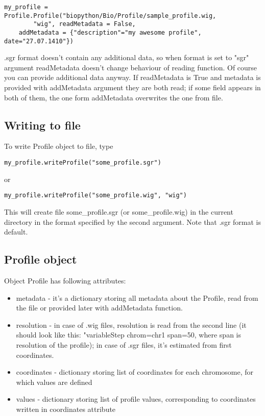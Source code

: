 \documentclass[a4paper,11pt,portrait]{article}
\begin{document}
\begin{verbatim}
my_profile = Profile.Profile("biopython/Bio/Profile/sample_profile.wig,
		"wig", readMetadata = False,
	addMetadata = {"description"="my awesome profile", date="27.07.1410"})
\end{verbatim}

.sgr format doesn't contain any additional data,
 so when format is set to "sgr" argument readMetadata doesn't change behaviour of reading function.
 Of course you can provide additional data anyway.
 If readMetadata is True and metadata is provided with addMetadata argument
 they are both read;
 if some field appears in both of them,
 the one form addMetadata overwrites the one from file.

\subsection{Writing to file}

To write Profile object to file, type

\begin{verbatim}
my_profile.writeProfile("some_profile.sgr")
\end{verbatim}

or

\begin{verbatim}
my_profile.writeProfile("some_profile.wig", "wig")
\end{verbatim}

This will create file some\_profile.sgr (or some\_profile.wig) in the current directory
 in the format specified by the second argument.
 Note that .sgr format is default.


\subsection{Profile object}

Object Profile has following attributes:

	\begin{itemize}

		\item metadata - it's a dictionary storing all metadata about the Profile,
			read from the file or provided later with addMetadata function.
		\item resolution - in case of .wig files,
			resolution is read from the second line
			(it should look like this: "variableStep chrom=chr1 span=50,
			where span is resolution of the profile);
			in case of .sgr files,
			it's estimated from first coordinates.
		\item coordinates - dictionary storing list of coordinates
			for each chromosome,
			for which values are defined
		\item values - dictionary storing list of profile values,
			corresponding to coordinates written in coordinates attribute

	\end{itemize}
\end{document}
